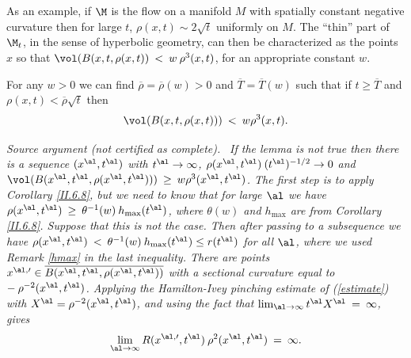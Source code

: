 As an example, if $\M$ is the flow on a manifold $M$ with spatially constant negative
curvature then for large $t$, $\rho(x,t) \sim 2 \sqrt{t}$ uniformly on $M$.
The ``thin'' part of $\M_t$, in the sense of hyperbolic geometry, can then be
characterized as the points $x$ so that $\vol(B(x,t,\rho(x,t)) \: < \: w \:
\rho^3(x,t)$, for an appropriate constant $w$.

\begin{lemma}
  \label{lem:kl-thick-thin-decomposition-thick-thin-geometry-lemma}
 \label{bigenough}
For any $w > 0$ we can find $\overline{\rho} = \overline{\rho}(w) > 0$
and $\overline{T}=\overline{T}(w)$
such that if $t\geq \overline{T}$ and $\rho(x,t) < \overline{\rho} \sqrt{t}$ then
\begin{equation}
\vol(B(x,t,\rho(x,t))) \: < \: w \rho^3(x,t).
\end{equation}
\end{lemma}
\par\medskip\noindent\textit{Source argument (not certified as complete).}\ \begingroup\itshape
If the lemma is not true then there is a sequence
$(x^\al, t^\al)$ with $t^\al \rightarrow \infty$,
$\rho(x^\al, t^\al) \: (t^\al)^{-1/2} \rightarrow 0$ and
$\vol(B(x^\al, t^\al, \rho(x^\al, t^\al))) \: \ge \: w \rho^3(x^\al, t^\al)$.
The first step is to apply Corollary \ref{II.6.8},
but we need to know that for large $\al$
we have
$\rho(x^\al, t^\al) \: \ge \: \theta^{-1}(w) \: h_{\max}(t^\al)$, where
$\theta(w)$ and $h_{\max}$ are
from Corollary \ref{II.6.8}. Suppose that
this is not the case. Then after passing to a subsequence we have
$\rho(x^\al, t^\al) \: < \: \theta^{-1}(w) \:
h_{\max}(t^\al) \le r(t^{\al})$ for all $\al$,
where we used Remark \ref{hmax} in the last inequality.
There are points
$x^{\al,\prime} \in \overline{B(x^\al, t^\al, \rho(x^\al, t^\al))}$
with a sectional curvature
equal to  $- \: \rho^{-2}(x^\al, t^\al)$.
Applying the Hamilton-Ivey pinching estimate of
(\ref{estimate}) with $X^\al = \rho^{-2}(x^\al, t^\al)$, and using the fact
that
$\lim_{\al \rightarrow \infty} t^\al X^\al \: = \:  \infty$, gives
\begin{equation} \label{Rblowup}
\lim_{\al \rightarrow \infty}
R(x^{\al,\prime}, t^\al) \: \rho^2(x^\al, t^\al) \: = \: \infty.
\end{equation}

